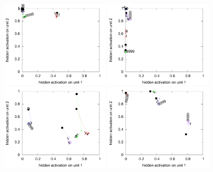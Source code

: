 
\begin{figure}[H]
  \centering
  \includegraphics[width=0.48\textwidth]{img/hid-bal-bad-init.pdf}  
  \includegraphics[width=0.48\textwidth]{img/hid-bal-bad-convex.pdf}  \\
  \includegraphics[width=0.48\textwidth]{img/hid-bal-bad-step.pdf}  
  \includegraphics[width=0.48\textwidth]{img/hid-bal-bad-stagnation.pdf}  \\

\end{figure}

